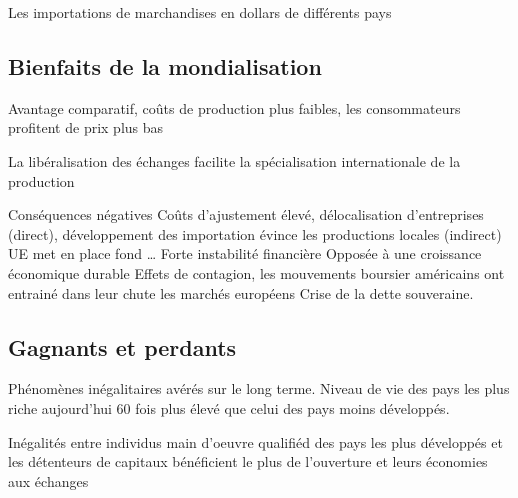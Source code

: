 \documentclass[main.tex]{subfiles}
\begin{document}
        Les importations de marchandises en dollars de différents pays

        \subsection{Bienfaits de la mondialisation}

        Avantage comparatif, coûts de production plus faibles, les consommateurs profitent de prix plus bas

        La libéralisation des échanges facilite la spécialisation internationale de la production

        Conséquences négatives
        Coûts d'ajustement élevé, délocalisation d'entreprises (direct), développement des importation évince les productions locales (indirect)
        UE met en place fond \ldots
        Forte instabilité financière
        Opposée à une croissance économique durable
        Effets de contagion, les mouvements boursier américains ont entrainé dans leur chute les marchés européens
        Crise de la dette souveraine.

        \subsection{Gagnants et perdants}
        
        Phénomènes inégalitaires avérés sur le long terme.
        Niveau de vie des pays les plus riche aujourd'hui 60 fois plus élevé que celui des pays moins développés.

        Inégalités entre individus
        main d'oeuvre qualifiéd des pays les plus développés et les détenteurs de capitaux bénéficient le plus de l'ouverture et leurs économies aux échanges 
\end{document}
